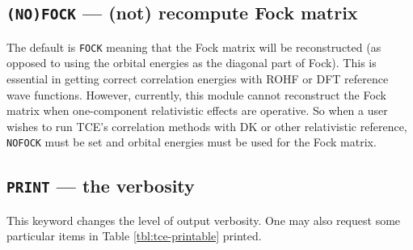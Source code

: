 \subsection{{\tt (NO)FOCK} --- (not) recompute Fock matrix}

The default is \verb+FOCK+ meaning that the Fock matrix will
be reconstructed (as opposed to using the orbital energies as the diagonal part of
Fock).  This is essential in getting correct correlation energies with ROHF or DFT
reference wave functions.  However, currently, this module cannot reconstruct the
Fock matrix when one-component relativistic effects are operative.  So when a user
wishes to run TCE's correlation methods with DK or other relativistic reference,
\verb+NOFOCK+ must be set and orbital energies must be used for the Fock matrix.

\subsection{{\tt PRINT} --- the verbosity}

This keyword changes the level of output verbosity.  One may also
request some particular items in Table \ref{tbl:tce-printable} printed.

